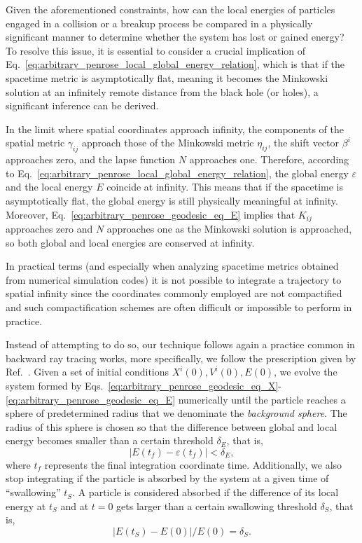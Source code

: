 Given the aforementioned constraints, how can the local energies of particles engaged in a collision or a breakup process be compared in a physically significant manner to determine whether the system has lost or gained energy? To resolve this issue, it is essential to consider a crucial implication of Eq.~\eqref{eq:arbitrary_penrose_local_global_energy_relation}, which is that if the spacetime metric is asymptotically flat, meaning it becomes the Minkowski solution at an infinitely remote distance from the black hole (or holes), a significant inference can be derived.

In the limit where spatial coordinates approach infinity, the components of the spatial metric $\gamma_{ij}$ approach those of the Minkowski metric $\eta_{ij}$, the shift vector $\beta^i$ approaches zero, and the lapse function $N$ approaches one. Therefore, according to Eq.~\eqref{eq:arbitrary_penrose_local_global_energy_relation}, the global energy $\varepsilon$ and the local energy $E$ coincide at infinity. This means that if the spacetime is asymptotically flat, the global energy is still physically meaningful at infinity. Moreover, Eq.~\eqref{eq:arbitrary_penrose_geodesic_eq_E} implies that $K_{ij}$ approaches zero and $N$ approaches one as the Minkowski solution is approached, so both global and local energies are conserved at infinity.

In practical terms (and especially when analyzing spacetime metrics obtained from numerical simulation codes) it is not possible to integrate a trajectory to spatial infinity since the coordinates commonly employed are not compactified and such compactification schemes are often difficult or impossible to perform in practice.

Instead of attempting to do so, our technique follows again a practice common in backward ray tracing works, more specifically, we follow the prescription given by Ref.~\cite{Bohn:2014xxa}. Given a set of initial conditions $X^i(0), V^i(0), E(0)$, we evolve the system formed by Eqs.~\eqref{eq:arbitrary_penrose_geodesic_eq_X}-\eqref{eq:arbitrary_penrose_geodesic_eq_E} numerically until the particle reaches a sphere of predetermined radius that we denominate the \emph{background sphere}. The radius of this sphere is chosen so that the difference between global and local energy becomes smaller than a certain threshold $\delta_E$, that is, 
%
\begin{equation}
  |E(t_f)- \varepsilon(t_f)| < \delta_E,
  \label{eq:arbitrary_penrose_background_sphere_cplision_condition}
\end{equation}
%
where $t_f$ represents the final integration coordinate time. Additionally, we also stop integrating if the particle is absorbed by the system at a given time of ``swallowing'' $t_S$. A particle is considered absorbed if the difference of its local energy at $t_S$ and at $t=0$ gets larger than a certain swallowing threshold $\delta_S$, that is, 
%
\begin{equation}
  |E(t_S) - E(0)|/E(0) = \delta_S.
  \label{eq:arbitrary_penrose_swallowing_condition}
\end{equation}

